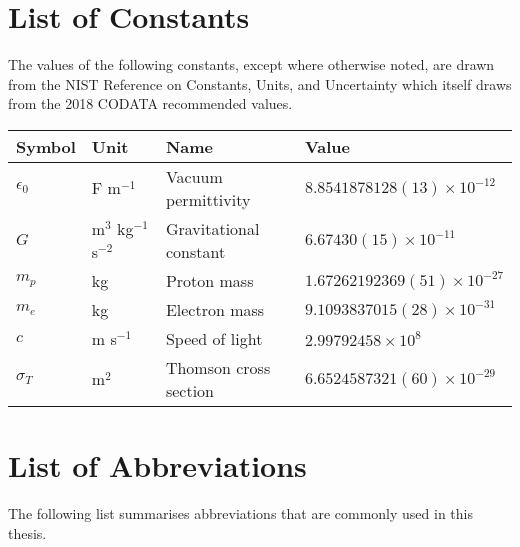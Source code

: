 
\chapter*{List of Constants}

The values of the following constants, except where otherwise noted, are drawn from the NIST Reference on Constants, Units, and Uncertainty \citep{mohr_nist_2019} which itself draws from the 2018 CODATA recommended values.

\begin{longtable}{llll}
\toprule
\bfseries Symbol & \bfseries Unit & \bfseries Name & \bfseries Value \\\midrule\endhead
$\epsilon_0$ & F m$^{-1}$ & Vacuum permittivity & $8.8541878128(13) \times 10^{-12}$ \\
$G$ & m$^3$ kg$^{-1}$ s$^{-2}$ & Gravitational constant & $6.67430(15) \times 10^{-11}$ \\
$m_p$ & kg & Proton mass & $1.67262192369(51) \times 10^{-27}$ \\
$m_e$ & kg & Electron mass & $9.1093837015(28) \times 10^{-31}$\\
$c$ & m s$^{-1}$ & Speed of light & $2.99792458 \times 10^8$ \\
$\sigma_T$ & m$^2$ & Thomson cross section & $6.6524587321(60) \times 10^{-29}$\\
\bottomrule
\end{longtable}

\chapter*{List of Abbreviations}

The following list summarises abbreviations that are commonly used in this thesis.

